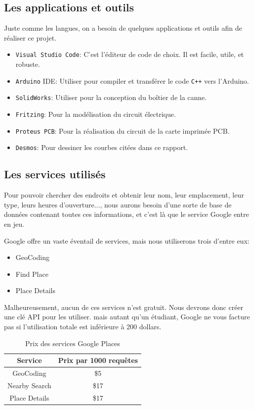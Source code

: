 \FloatBarrier

\subsection{Les applications et outils}
Juste comme les langues, on a besoin de quelques applications et outils afin de réaliser ce projet.

\begin{itemize}
    \item \verb|Visual Studio Code|: C'est l'éditeur de code de choix. Il est facile, utile, et robuste.
    \item \verb|Arduino| \acrshort{IDE}: Utiliser pour compiler et transférer le code \verb|C++| vers l'Arduino.
    \item \verb|SolidWorks|: Utiliser pour la conception du boîtier de la canne.
    \item \verb|Fritzing|: Pour la modélisation du circuit électrique.
    \item \verb|Proteus PCB|: Pour la réalisation du circuit de la carte imprimée \acrshort{PCB}.
    \item \verb|Desmos|: Pour dessiner les courbes citées dans ce rapport.
\end{itemize}

\subsection{Les services utilisés}

Pour pouvoir chercher des endroits et obtenir leur nom, leur emplacement, leur type, leurs heures d’ouverture..., nous aurons besoin d’une sorte de base de données contenant toutes ces informations, et c’est là que le service Google entre en jeu.

Google offre un vaste éventail de services, mais nous utiliserons trois d’entre eux:
\begin{itemize}
    \item GeoCoding
    \item Find Place
    \item Place Details
\end{itemize}

Malheureusement, aucun de ces services n’est gratuit. Nous devrons donc créer une clé API pour les utiliser. mais autant qu'un étudiant, Google ne vous facture pas si l’utilisation totale est inférieure à 200 dollars.

\bgroup
\def\arraystretch{1.5}%
\begin{table}
    \centering
    \begin{tabular}{|c|c|}
        \hline
        Service & Prix par 1000 requêtes \\
        \hline
        GeoCoding & \$5 \\
        \hline
        Nearby Search & \$17 \\
        \hline
        Place Details & \$17 \\
        \hline
    \end{tabular}
    \caption{Prix des services Google Places \cite{google-maps-pricing}}
\end{table}
\egroup

